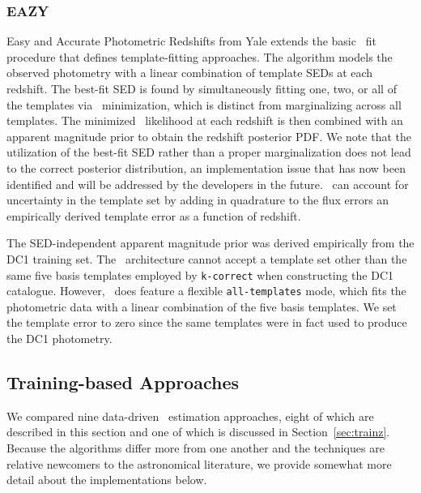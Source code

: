 \subsubsection{EAZY}
\label{sec:eazy}

Easy and Accurate Photometric Redshifts from Yale \citep[\eazy\footnote{\url{https://github.com/gbrammer/eazy-photoz}},][]{Brammer:08} extends the basic \chisq\ fit procedure that defines template-fitting approaches.
The algorithm models the observed photometry with a linear combination of template SEDs at each redshift.
The best-fit SED is found by simultaneously fitting one, two, or all of the templates via \chisq\ minimization, which is distinct from marginalizing across all templates.
The minimized \chisq\ likelihood at each redshift is then combined with an apparent magnitude prior to obtain the redshift posterior PDF.
We note that the utilization of the best-fit SED rather than a proper marginalization does not lead to the correct posterior distribution, an implementation issue that has now been identified and will be addressed by the developers in the future.
\eazy\ can account for uncertainty in the template set by adding in quadrature to the flux errors an empirically derived template error as a function of redshift.

The SED-independent apparent magnitude prior was derived empirically from the DC1 training set.
The \eazy\ architecture cannot accept a template set other than the same five basis templates employed by \texttt{k-correct} when constructing the DC1 catalogue.
However, \eazy\ does feature a flexible \texttt{all-templates} mode, which fits the photometric data with a linear combination of the five basis templates.
We set the template error to zero since the same templates were in fact used to produce the DC1 photometry.

\subsection{Training-based Approaches}
\label{sec:trainingcodes}

We compared nine data-driven \pz\ estimation approaches, eight of which are described in this section and one of which is discussed in Section~\ref{sec:trainz}.
Because the algorithms differ more from one another and the techniques are relative newcomers to the astronomical literature, we provide somewhat more detail about the implementations below.

